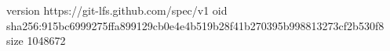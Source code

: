 version https://git-lfs.github.com/spec/v1
oid sha256:915bc6999275ffa899129cb0e4e4b519b28f41b270395b998813273cf2b530f8
size 1048672
